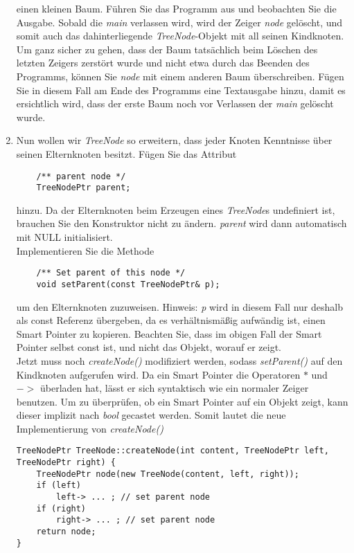 \documentclass[
  accentcolor=tud1c,	%
  colorbacktitle,		%
  inverttitle,			%
  german,				%
  twoside
]{tudexercise}
\begin{document}
\begin{enumerate}
einen kleinen Baum. Führen Sie das Programm aus und beobachten Sie die Ausgabe. Sobald die \emph{main} verlassen wird, wird der Zeiger \emph{node} gelöscht, und somit auch das dahinterliegende \emph{TreeNode}-Objekt mit all seinen Kindknoten. \\

Um ganz sicher zu gehen, dass der Baum tatsächlich beim Löschen des letzten Zeigers zerstört wurde und nicht etwa durch das Beenden des Programms, können Sie \emph{node} mit einem anderen Baum überschreiben. Fügen Sie in diesem Fall am Ende des Programms eine Textausgabe hinzu, damit es ersichtlich wird, dass der erste Baum noch vor Verlassen der \emph{main} gelöscht wurde.

\item Nun wollen wir \emph{TreeNode} so erweitern, dass jeder Knoten Kenntnisse über seinen Elternknoten besitzt. Fügen Sie das Attribut  
\begin{lstlisting}
	/** parent node */
	TreeNodePtr parent;
\end{lstlisting}

hinzu. Da der Elternknoten beim Erzeugen eines \emph{TreeNode}s undefiniert ist, brauchen Sie den Konstruktor nicht zu ändern. \emph{parent} wird dann automatisch mit NULL initialisiert.\\

Implementieren Sie die Methode
\begin{lstlisting}
	/** Set parent of this node */
	void setParent(const TreeNodePtr& p);
\end{lstlisting}

um den Elternknoten zuzuweisen. Hinweis: \emph{p} wird in diesem Fall nur deshalb als const Referenz übergeben, da es verhältnismäßig aufwändig ist, einen Smart Pointer zu kopieren. Beachten Sie, dass im obigen Fall der Smart Pointer selbst const ist, und nicht das Objekt, worauf er zeigt.\\

Jetzt muss noch \emph{createNode()} modifiziert werden, sodass \emph{setParent()} auf den Kindknoten aufgerufen wird. Da ein Smart Pointer die Operatoren $*$ und $->$ überladen hat, lässt er sich syntaktisch wie ein normaler Zeiger benutzen. Um zu überprüfen, ob ein Smart Pointer auf ein Objekt zeigt, kann dieser implizit nach \emph{bool} gecastet werden. Somit lautet die neue Implementierung von \emph{createNode()}

\begin{lstlisting}
TreeNodePtr TreeNode::createNode(int content, TreeNodePtr left, TreeNodePtr right) {
	TreeNodePtr node(new TreeNode(content, left, right));
	if (left)
		left-> ... ; // set parent node
	if (right)
		right-> ... ; // set parent node
	return node;
}
\end{lstlisting}


\end{enumerate}
\end{document}
